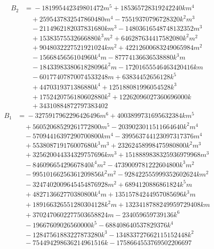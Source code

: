 \documentclass[11pt,reqno,letterpaper]{amsart}
\theoremstyle{definition}
\numberwithin{equation}{section}
\begin{document}
\begin{align*}
B_2&={}-181995442349801472 m^{5} + 185365728319242240 k m^{4}\\
&\quad{} + 2595437832547860480 m^{4} - 75519370796728320 k^{2} m^{3}\\
&\quad{} - 2114962182037831680 k m^{3} - 14803616548748132352 m^{3}\\
&\quad{} + 15383575532666880 k^{3} m^{2} + 646287634417582080 k^{2} m^{2}\\
&\quad{} + 9048032227521921024 k m^{2} + 42212600683249065984 m^{2}\\
&\quad{} - 1566845656104960 k^{4} m - 87774136636538880 k^{3} m\\
&\quad{} - 1843398338061828096 k^{2} m - 17201655546463420416 k m\\
&\quad{} - 60177407870074533248 m + 63834452656128 k^{5}\\
&\quad{} + 4470319371386880 k^{4} + 125188081996054528 k^{3}\\
&\quad{} + 1752420756180602880 k^{2} + 12262096027360696000 k\\
&\quad{} + 34310884872797383402
\end{align*}
\begin{align*}
B_1&={}-3275917962296426496 m^{6} + 4003899731695632384 k m^{5}\\
&\quad{} + 56052068529261772800 m^{5} - 2039023011511664640 k^{2} m^{4}\\
&\quad{} - 57094416397290700800 k m^{4} - 399563744123097317376 m^{4}\\
&\quad{} + 553808719176007680 k^{3} m^{3} + 23262458998475980800 k^{2} m^{3}\\
&\quad{} + 325620044334329757696 k m^{3} + 1518889838325936979968 m^{3}\\
&\quad{} - 84609665429667840 k^{4} m^{2} - 4739009781222604800 k^{3} m^{2}\\
&\quad{} - 99510166256361209856 k^{2} m^{2} - 928422555999352602624 k m^{2}\\
&\quad{} - 3247402009645454876928 m^{2} + 6894120886861824 k^{5} m\\
&\quad{} + 482713662770380800 k^{4} m + 13515784244957085696 k^{3} m\\
&\quad{} + 189166326551280304128 k^{2} m + 1323418788249959729408 k m\\
&\quad{} + 3702470602277503658824 m - 234059659739136 k^{6}\\
&\quad{} - 19667609026560000 k^{5} - 688408640537829376 k^{4}\\
&\quad{} - 12847561883227873280 k^{3} - 134833727662115152448 k^{2}\\
&\quad{} - 754494298636214961516 k - 1758664553769502206697
\end{align*}
\end{document}

